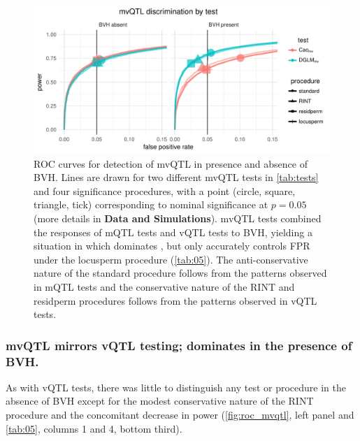     \begin{figure}
        \centering
        \includegraphics[width = \linewidth]{images/simple_rocs_mvqtl_all_facet_by_bvh.pdf}
        \caption[
          ROC curves for detection of mvQTL in presence and absence of BVH. 
        ]
        {
            ROC curves for detection of mvQTL in presence and absence of BVH. 
            Lines are drawn for two different mvQTL tests in \autoref{tab:tests} and four significance procedures, with a point (circle, square, triangle, tick) corresponding to nominal significance at $p=0.05$ (more details in \textbf{Data and Simulations}).
            mvQTL tests combined the responses of mQTL tests and vQTL tests to BVH, yielding a situation in which \DGLMmv dominates \Caomv, but only accurately controls FPR under the locusperm procedure (\autoref{tab:05}).
            The anti-conservative nature of the standard procedure follows from the patterns observed in mQTL tests and the conservative nature of the RINT and residperm procedures follows from the patterns observed in vQTL tests.
        }
        \label{fig:roc_mvqtl}
    \end{figure}

    \subsubsection{mvQTL mirrors vQTL testing; \DGLMmv dominates \Caomv in the presence of BVH.}
        As with vQTL tests, there was little to distinguish any test or procedure in the absence of BVH except for the modest conservative nature of the RINT procedure and the concomitant decrease in power (\autoref{fig:roc_mvqtl}, left panel and \autoref{tab:05}, columns 1 and 4, bottom third).
        
